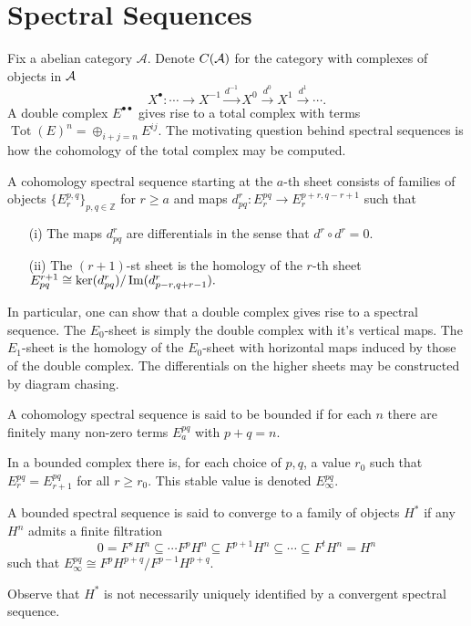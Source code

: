 \section{Spectral Sequences}
Fix a abelian category $\mathcal{A}$.
Denote $C(\AA)$ for the category with complexes of objects in $\AA$
$$X^\bullet :\cdots \xrightarrow{}  X^{-1}\xrightarrow{d^{-1}} X^0 \xrightarrow{d^{0}} X^1\xrightarrow{d^1} \cdots.$$
A double complex $E^{\bullet \bullet}$ gives rise to a total complex with terms  $\operatorname{Tot}(E)^n = \oplus_{i+j=n} E^{ij}$.
The motivating question behind spectral sequences is how the cohomology of the total complex may be computed.
\begin{definition}
  A cohomology spectral sequence starting at the $a$-th sheet consists of families of objects $ \{E^{p,q}_r\}_{p,q\in \mathbb{Z}}$ for $r\geq a$ and maps
  $d_{pq}^r : E^{pq}_r \to E^{p+r,q-r+1}_r $
  such that
  \begin{enumerate}
    \item[(i)]  The maps $d^r_{pq}$ are differentials in the sense that
    $d^r \circ d^r = 0.$
    \item[(ii)] The $(r+1)$-st sheet is the homology of the $r$-th sheet
    $E_{pq}^{r+1} \cong \ker(d_{pq}^r)/ \img(d_{p-r,q+r-1}^r).$
  \end{enumerate}
\end{definition}
In particular, one can show that a double complex gives rise to a spectral sequence.
The $E_0$-sheet is simply the double complex with it's vertical maps.
The $E_1$-sheet is the homology of the $E_0$-sheet with horizontal maps induced by those of the double complex.
The differentials on the higher sheets may be constructed by diagram chasing.
\begin{definition}
  A cohomology spectral sequence is said to be bounded if for each $n$ there are finitely many non-zero terms $E^{pq}_a$ with $p+q = n$.
\end{definition}
In a bounded complex there is, for each choice of $p,q$, a value $r_0$ such that $E_{r}^{pq}= E_{r+1}^{pq}$ for all $r \geq r_0$. This stable value is denoted $E^{pq}_\infty$.
\begin{definition}
  A bounded spectral sequence is said to converge to a family of objects $H^*$ if any $H^n$ admits a finite filtration
  $$0 = F^s H^n \subseteq \cdots F^p H^n \subseteq F^{p+1}H^n \subseteq \cdots \subseteq F^t H^n = H^n $$
  such that $E^{pq}_\infty \cong F^p H^{p+q} / F^{p-1} H^{p+q}$.
\end{definition}
Observe that $H^*$ is not necessarily uniquely identified by a convergent spectral sequence.
